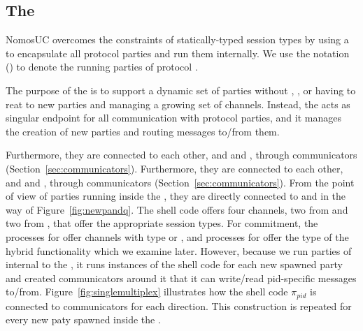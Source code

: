 

\subsection{The \partywrapper}
NomosUC overcomes the constraints of statically-typed session types by using a \partywrapper to encapsulate all protocol parties and run them internally.
We use the notation (\PI) to denote the \partywrapper running parties of protocol \PI.

The purpose of the \partywrapper is to support a dynamic set of parties without \Z, \A, or \F having to reat to new parties and managing a growing set of channels.
Instead, the \partywrapper acts as singular endpoint for all communication with protocol parties, and it manages the creation of new parties and routing messages to/from them.

Furthermore, they are connected to each other, and \Z and \A, through communicators (Section~\ref{sec:communicators}).
Furthermore, they are connected to each other, and \Z and \A, through communicators (Section~\ref{sec:communicators}).
From the point of view of parties running inside the \partywrapper, they are directly connected to \F and \Z in the way of Figure~\ref{fig:newpandq}.
The shell code offers four channels, two from \F and two from \Z, that offer the appropriate session types. 
For commitment, the processes for \Z offer channels with type  or , and processes for \F offer the type of the hybrid functionality \Fro which we examine later.
However, because we run parties of \PI internal to the \partywrapper, it runs instances of the shell code for each new spawned party and created communicators around it that it can write/read pid-specific messages to/from.
Figure~\ref{fig:singlemultiplex} illustrates how the shell code $\pi_{pid}$ is connected to communicators for each direction. This construction is repeated for every new paty spawned inside the \partywrapper.


